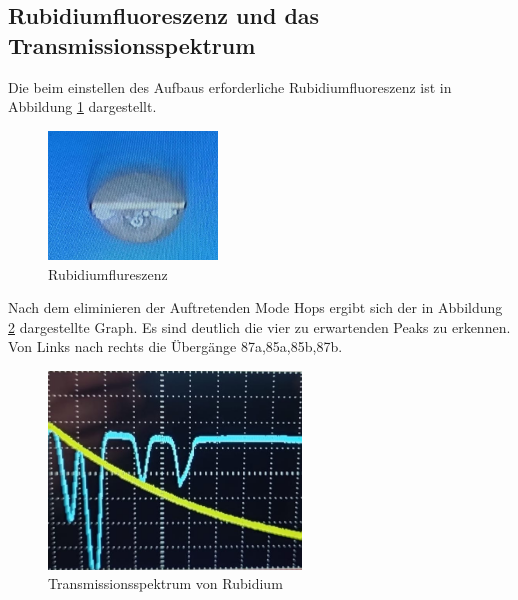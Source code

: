 \subsection{Rubidiumfluoreszenz und das Transmissionsspektrum}
Die beim einstellen des Aufbaus erforderliche Rubidiumfluoreszenz ist in Abbildung \ref{fig:Fluoresenz} dargestellt.
\begin{figure}[h]
    \centering
    \includegraphics[width=0.4\textwidth]{abb/Fluresenz.jpeg}
    \caption{Rubidiumflureszenz}
    \label{fig:Fluoresenz}
\end{figure}
Nach dem eliminieren der Auftretenden Mode Hops ergibt sich der in  Abbildung \ref{fig:graph} dargestellte Graph.
Es sind deutlich die vier zu erwartenden Peaks zu erkennen.
Von Links nach rechts die Übergänge 87a,85a,85b,87b.
\begin{figure}[h]
    \centering
    \includegraphics[width=0.6\textwidth]{abb/Graph.jpeg}
    \caption{Transmissionsspektrum von Rubidium}
    \label{fig:graph}
\end{figure}